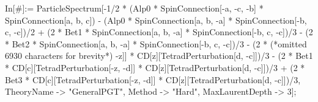 In[\#]:= ParticleSpectrum[-1/2 * (Alp0 * SpinConnection[-a, -c, -b] * SpinConnection[a, b, c]) - (Alp0 * SpinConnection[a, b, -a] * SpinConnection[-b, c, -c])/2 + (2 * Bet1 * SpinConnection[a, b, -a] * SpinConnection[-b, c, -c])/3 - (2 * Bet2 * SpinConnection[a, b, -a] * SpinConnection[-b, c, -c])/3 - (2 * (*omitted 6930 characters for brevity*) -z]] * CD[z][TetradPerturbation[d, -c]])/3 - (2 * Bet1 * CD[c][TetradPerturbation[-z, -d]] * CD[z][TetradPerturbation[d, -c]])/3 + (2 * Bet3 * CD[c][TetradPerturbation[-z, -d]] * CD[z][TetradPerturbation[d, -c]])/3, TheoryName -> "GeneralPGT", Method -> "Hard", MaxLaurentDepth -> 3];